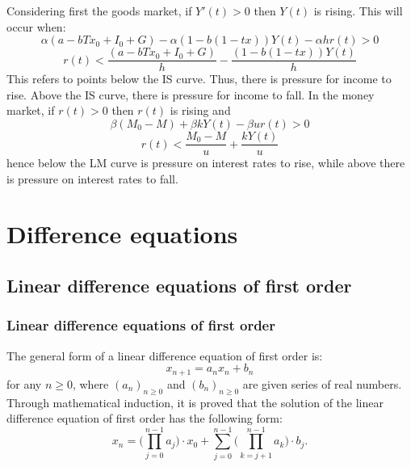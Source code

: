 \documentclass[11]{beamer}
\begin{document}
\begin{frame}
 Considering first the goods market, if $Y'(t)>0$ then $Y(t)$ is rising. This will occur when:
$$\alpha(a-bTx_{0}+I_{0}+G)-\alpha(1-b(1-tx))Y(t)-\alpha hr(t)>0$$
$$r(t)<\frac{(a-bTx_{0}+I_{0}+G)}{h}-\frac{(1-b(1-tx))Y(t)}{h}$$
This refers to points below the IS curve. Thus, there is pressure for income to rise. Above the IS curve, there is pressure for income to fall.
In the money market, if $r(t)>0$ then $r(t)$ is rising and
$$\beta(M_{0}-M)+\beta kY(t)-\beta ur(t)>0$$
$$r(t)<\frac{M_{0}-M}{u}+\frac{kY(t)}{u}$$
hence below the LM curve is pressure on interest rates to rise, while above there is pressure on interest rates to fall. 

\end{frame}

\section{Difference equations}
\subsection{Linear difference equations of first order}
\begin{frame}
 \frametitle{Linear difference equations of first order}
 The general form of a linear difference equation of first order is:
    \begin{equation} 
     x_{n+1}=a_{n}x_{n}+b_{n} \label{2.1}
    \end{equation}
    for any $n \geq 0$, where $(a_{n})_{n\geq 0}$ and $(b_{n})_{n\geq 0}$ are given series of real numbers. 
    Through mathematical induction, it is proved that the solution of the linear difference equation of first order has the following form:
\begin{equation}\label{2.2}
 x_{n}=\bigg( \prod_{j=0}^{n-1} a_{j} \bigg) \cdot x_{0} + \sum_{j=0}^{n-1} \bigg( \prod_{k=j+1}^{n-1} a_{k} \bigg)\cdot b_{j}.
\end{equation}
\end{frame}
\end{document}
